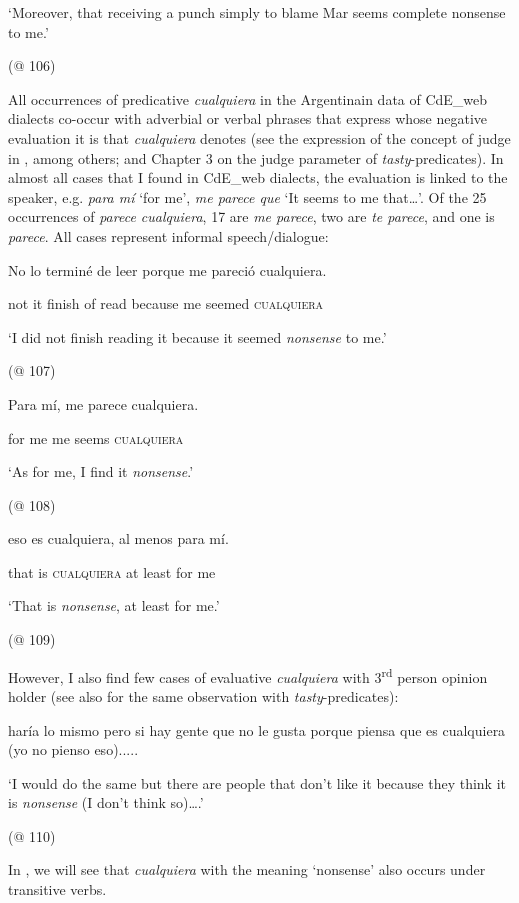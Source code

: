 \documentclass[output=paper]{langscibook}
\begin{document}
    ‘Moreover, that receiving a punch simply to blame Mar seems complete nonsense to me.’

    (@ 106)

All occurrences of predicative \textit{cualquiera} in the Argentinain data of CdE\_web dialects co-occur with adverbial or verbal phrases that express whose negative evaluation it is that \textit{cualquiera} denotes (see the expression of the concept of judge in \citealt{Lasersohn2005}, among others; and Chapter 3 on the judge parameter of \textit{tasty}{}-predicates). In almost all cases that I found in CdE\_web dialects, the evaluation is linked to the speaker, e.g. \textit{para mí} ‘for me’, \textit{me parece que} ‘It seems to me that…’. Of the 25 occurrences of \textit{parece cualquiera}, 17 are \textit{me parece}, two are \textit{te parece}, and one is \textit{parece}. All cases represent informal speech/dialogue:

    No  lo  terminé  de  leer  porque  me  pareció  cualquiera.

    not  it  finish  of  read  because  me  seemed  \textsc{cualquiera}

    ‘I did not finish reading it because it seemed \textit{nonsense} to me.’

    (@ 107)

    Para  mí,  me  parece  cualquiera.

    for  me  me  seems  \textsc{cualquiera}

    ‘As for me, I find it \textit{nonsense}.’

    (@ 108)

    eso  es  cualquiera,  al  menos  para  mí.

    that  is  \textsc{cualquiera}  at  least  for  me

    ‘That is \textit{nonsense}, at least for me.’

    (@ 109)

However, I also find few cases of evaluative \textit{cualquiera} with 3\textsuperscript{rd} person opinion holder (see also \citealt{Lasersohn2005} for the same observation with \textit{tasty}{}-predicates):

    haría lo mismo pero si hay gente que no le gusta porque piensa que es cualquiera (yo no pienso eso).....

    ‘I would do the same but there are people that don’t like it because they think it is \textit{nonsense} (I don’t think so)….’

    (@ 110)

In , we will see that \textit{cualquiera} with the meaning ‘nonsense’ also occurs under transitive verbs.
\end{document}
